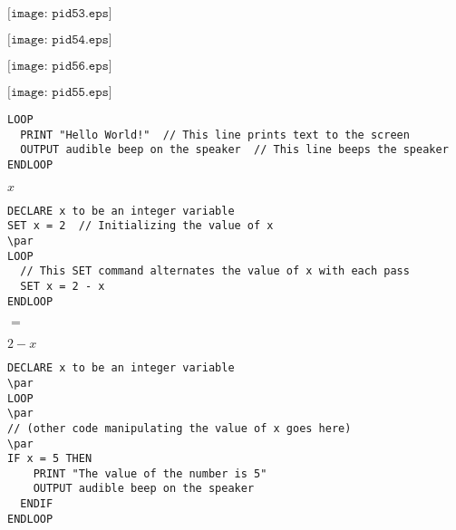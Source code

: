 \documentclass[12pt,a4paper,margin=2cm]{book}
\def\lthtmlcheckvsize{\ifdim\ht\sizebox<\vsize 
  \ifdim\wd\sizebox<\hsize\expandafter\hfill\fi \expandafter\vfill
  \else\expandafter\vss\fi}%
\begin{document}
{\newpage\clearpage
{}%
$\displaystyle \texttt{[image: pid53.eps]}$%
\lthtmlindisplaymathZ
\lthtmlcheckvsize\clearpage}

{\newpage\clearpage
{}%
$\displaystyle \texttt{[image: pid54.eps]}$%
\lthtmlindisplaymathZ
\lthtmlcheckvsize\clearpage}

{\newpage\clearpage
{}%
$\displaystyle \texttt{[image: pid56.eps]}$%
\lthtmlindisplaymathZ
\lthtmlcheckvsize\clearpage}

{\newpage\clearpage
{}%
$\displaystyle \texttt{[image: pid55.eps]}$%
\lthtmlindisplaymathZ
\lthtmlcheckvsize\clearpage}

{\newpage\clearpage
{}%
\begin{lstlisting}
LOOP
  PRINT "Hello World!"  // This line prints text to the screen
  OUTPUT audible beep on the speaker  // This line beeps the speaker
ENDLOOP
\end{lstlisting}%
\lthtmlfigureZ
\lthtmlcheckvsize\clearpage}

{\newpage\clearpage
{}%
$ x$%
\lthtmlindisplaymathZ
\lthtmlcheckvsize\clearpage}

{\newpage\clearpage
{}%
\begin{lstlisting}
DECLARE x to be an integer variable
SET x = 2  // Initializing the value of x
\par
LOOP
  // This SET command alternates the value of x with each pass
  SET x = 2 - x  
ENDLOOP
\end{lstlisting}%
\lthtmlfigureZ
\lthtmlcheckvsize\clearpage}

{\newpage\clearpage
{}%
$ =$%
\lthtmlindisplaymathZ
\lthtmlcheckvsize\clearpage}

{\newpage\clearpage
{}%
$ 2 - x$%
\lthtmlindisplaymathZ
\lthtmlcheckvsize\clearpage}

{\newpage\clearpage
{}%
\begin{lstlisting}
DECLARE x to be an integer variable
\par
LOOP
\par
// (other code manipulating the value of x goes here)
\par
IF x = 5 THEN 
    PRINT "The value of the number is 5"
    OUTPUT audible beep on the speaker
  ENDIF
ENDLOOP
\end{lstlisting}%
\lthtmlfigureZ
\lthtmlcheckvsize\clearpage}
\end{document}
